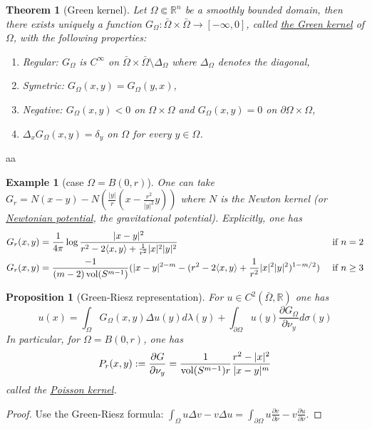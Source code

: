 \documentclass[11pt]{article}
\newtheorem{theorem}{Theorem}
\newtheorem{proposition}{Proposition}[theorem]
\newtheorem{exampl}{Example}
\newcommand{\vol}{\mathop{\rm vol}\nolimits}
\begin{document}
\begin{theorem}[Green kernel]
\label{thm:green-kernel}
Let \(\Omega \Subset \mathbb{R}^n\) be a smoothly bounded domain, then there exists
uniquely a function \(G_\Omega :\bar\Omega\times\bar\Omega \longrightarrow  [-\infty, 0]\), called \uline{the Green kernel} of \(\Omega\), with the following properties:
\begin{enumerate}
\item Regular: \(G_\Omega\) is \(C^\infty\) on \(\bar\Omega\times\bar\Omega\setminus
   \Delta_\Omega\) where \(\Delta_\Omega\) denotes the diagonal,
\item Symetric: \(G_\Omega(x,y) = G_\Omega(y,x)\),
\item Negative: \(G_\Omega(x,y) <0\) on \(\Omega\times\Omega\) and \(G_\Omega(x,y) = 0\) on \(\partial\Omega\times \Omega\),
\item \(\Delta_x G_\Omega(x,y) = \delta_y\) on \(\Omega\) for every \(y\in \Omega\).
\end{enumerate}
\end{theorem}
aa
\begin{exampl}[case \( \Omega = B(0,r) \)]
One can take \(G_{r}=N(x-y) - N(\frac{|y|}{r}(x-\frac{r^2}{|y|^2}y))\) where \(N\) is
the Newton kernel (or \href{https://en.wikipedia.org/wiki/Newtonian\_potential}{Newtonian potential}, the gravitational potential). Explicitly, one
has
\begin{align}
G_r(x,y) &= \frac{1}{4\pi}\log \frac{|x-y|^2}{r^2 -2 \langle x,y \rangle
+\frac{1}{r^2}|x|^2|y|^2} &\text{ if } n=2\\
G_r(x,y) &=\frac{-1}{(m-2)\vol(S^{m-1})}(|x-y|^{2-m} - (r^2 - 2 \langle x,y \rangle  + \frac{1}{r^2}|x|^2|y|^2)^{1-m/2}) &\text{ if } n\geq 3
\end{align}
\end{exampl}

\begin{proposition}[Green-Riesz representation]
For \(u\in C^2(\bar \Omega, \mathbb{R})\) one has
\[
u(x) = \int_{\Omega}G_\Omega(x,y) \Delta u(y) d\lambda(y) + \int_{\partial\Omega} u(y)
\frac{\partial G_\Omega}{\partial \nu_y} d\sigma(y)
\]
In particular, for \(\Omega = B(0,r)\), one has 
\[ 
P_r(x,y) := \frac{\partial G}{\partial
\nu_y} =\frac{1}{\vol(S^{m-1})r}\frac{r^2 - |x|^2}{|x-y|^m}
\]
called the \uline{Poisson kernel}.
\end{proposition}
\begin{proof}
Use the Green-Riesz formula: \(\int_\Omega u\Delta v - v\Delta u = \int_{\partial
\Omega}u \frac{\partial v}{\partial \nu} - v \frac{\partial u}{\partial \nu}\).
\end{proof}
\end{document}
